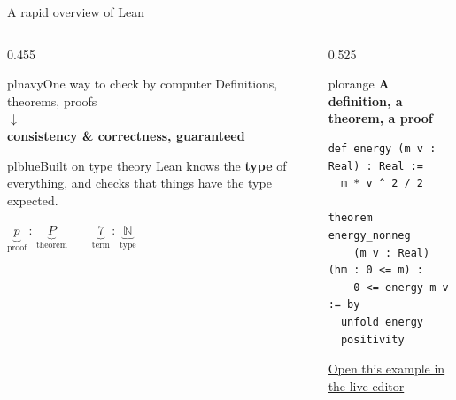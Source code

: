 \documentclass[aspectratio=169,10pt]{beamer}
\newcommand{\plbody}{\small}
\newcommand{\plmeta}{\footnotesize}
\newcommand{\pllabel}{\footnotesize\bfseries}
\begin{document}
\begin{frame}[fragile]{A rapid overview of Lean}
  \vfill
  \begin{columns}[c,onlytextwidth]

    \begin{column}{0.455\textwidth}
      \begin{plcard}[halign=center,top=5pt,bottom=5pt]%
                    {plnavy}{\hfill One way to check by computer\hfill}
        \plbody Definitions, theorems, proofs\\[2pt]
        {\color{plorange}$\downarrow$}\\[2pt]
        \textbf{consistency \& correctness, guaranteed}
      \end{plcard}

      \begin{plcard}[top=5pt,bottom=5pt,before skip=2pt]{plblue}{Built on type theory}
        \plbody
        Lean knows the \textbf{type} of everything, and checks
        that things have the type expected.\par
        \vspace{4pt}
        {\centering\plbody
          $\underbrace{p}_{\text{proof}}\,:\,\underbrace{P}_{\text{theorem}}
           \qquad
           \underbrace{7}_{\text{term}}\,:\,\underbrace{\mathbb{N}}_{\text{type}}$\par}
      \end{plcard}
    \end{column}

    \begin{column}{0.525\textwidth}
      \begin{plplain}[top=3pt,bottom=3pt]{plorange}
        {\pllabel\color{plember}A definition, a theorem, a proof}
        \vspace{3pt}
\begin{lstlisting}
def energy (m v : Real) : Real :=
  m * v ^ 2 / 2

theorem energy_nonneg
    (m v : Real) (hm : 0 <= m) :
    0 <= energy m v := by
  unfold energy
  positivity
\end{lstlisting}
      \end{plplain}
      \vspace{4pt}
      \begin{center}
        {\plmeta\color{white!85}\;
          \href{https://live.lean-lang.org/\#codez=JYWwDg9gTgLgBAWQIYwBYBtgCMBQP0CmIIScwAdgMYTkDOwtMB5MA\%2BmgdEXABSkBccQCSEASl4AzOIMCohHEBJhHGljBkgLxwB6rAE84taFF15CxUgHcoNAObtUnKN0EAGOOoBMUrbv1RDcY0QkcNS\%2BBJRsHFwgvKRYwVLCyjFwANRwcWmUIgB6ACyuOHBFxUh5qellmXmFxUVpuQBUpQDMDRlwjS0NlDW19U1t2c3ljVhD3b3F\%2FUjdQyNts82TdXAAbE3ZboMeaeulW5Sb5etjB5vL5QCMW\%2FsLlFc3290PA1izHvxeNVAUVnjkNGo4AArjAkFhCHAACYESTMAhQKy6HjRABuCQASgQkOgklicZ4atEGnB0dk4B4APQUmo4SIOaLwxHaVgA8jkAhWXhozHY3G8VDRZxwAA86hAyhqLjFcCZSLgPM\%2B6W0NWB5HEEHQUNlHOZNUg9BgwFRwBg2iAA}%
            {\color{white!85}Open this example in the live editor}}
      \end{center}
    \end{column}


\end{columns}
\end{frame}
\end{document}
